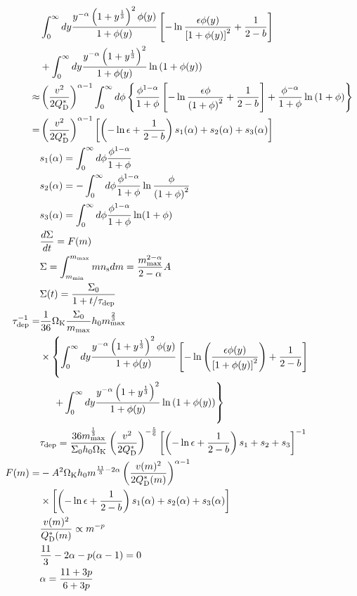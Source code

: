 \documentclass[11pt,a4paper,oneside,onecolumn]{jreport}
\begin{document}
\begin{align}
 &\int_0^{\infty} dy \frac{y^{- \alpha} \left( 1 + y^{\frac{1}{3}} \right)^2 \phi(y)}{1 + \phi(y)} \left[ - \ln \frac{\epsilon \phi(y)}{\left[ 1 + \phi(y) \right]^2} + \frac{1}{2 - b} \right]\\
 &+ \int_0^{\infty} dy \frac{y^{- \alpha} \left( 1 + y^{\frac{1}{3}} \right)^2}{1 + \phi(y)} \ln \left( 1 + \phi(y) \right)\\
 \approx& \left(\frac{v^2}{2Q_{\rm D}^{\ast}}\right)^{\alpha - 1} \int_0^{\infty} d \phi \left\{ \frac{\phi^{1 - \alpha}}{1 + \phi} \left[ - \ln \frac{\epsilon \phi}{\left(1 + \phi\right)^2} + \frac{1}{2 - b} \right] + \frac{\phi^{- \alpha}}{1 + \phi} \ln \left(1 + \phi \right) \right\}\\
 =& \left(\frac{v^2}{2Q_{\rm D}^{\ast}}\right)^{\alpha - 1} \left[ \left(- \ln \epsilon + \frac{1}{2 - b} \right) s_1(\alpha) + s_2(\alpha) + s_3(\alpha) \right]\\
 &s_1(\alpha) = \int_0^{\infty} d \phi \frac{\phi^{1 - \alpha}}{1 + \phi}\\
 &s_2(\alpha) = - \int_0^{\infty} d \phi \frac{\phi^{1 - \alpha}}{1 + \phi} \ln \frac{\phi}{\left(1 + \phi \right)^2}\\
 &s_3(\alpha) = \int_0^{\infty} d \phi \frac{\phi^{1 - \alpha}}{1 + \phi} \ln (1 + \phi)\\
 &\frac{d \Sigma}{d t} = F(m)\\
 &\Sigma = \int_{m_{\rm min}}^{m_{\rm max}} m n_{\rm s} dm = \frac{m_{\rm max}^{2 - \alpha}}{2 - \alpha} A\\ 
 &\Sigma(t) = \frac{\Sigma_0}{1 + t/\tau_{\rm dep}}\\
 \tau_{\rm dep}^{-1} =& \frac{1}{36}\Omega_{\rm K}\frac{\Sigma_0}{m_{\rm max}}h_0 m_{\rm max}^{\frac{2}{3}}\\
 &\times \left\{ \int_0^{\infty} dy \frac{y^{-\alpha}\left(1 + y^{\frac{1}{3}}\right)^2\phi(y)}{1 + \phi(y)} \left[ - \ln \left( \frac{\epsilon\phi(y)}{\left[1 + \phi(y)\right]^2} \right) + \frac{1}{2 - b} \right] \right.\\
 &\left. \ \ \ \ + \int_0^{\infty} dy \frac{y^{- 
\alpha}\left(1 + y^{\frac{1}{3}}\right)^2}{1 + \phi(y)} \ln \left( 1 + \phi(y) \right) \right\}\\
 &\tau_{\rm dep} = \frac{36 m_{\rm max}^{\frac{1}{3}}}{\Sigma_0h_0\Omega_{\rm K}} \left( \frac{v^2}{2Q_{\rm D}^{\ast}} \right)^{- \frac{5}{6}} \left[ \left(- \ln \epsilon + \frac{1}{2 - b} \right) s_1 + s_2 + s_3 \right]^{-1}\\
 F(m) =& - A^2 \Omega_{\rm K} h_0 m^{\frac{11}{3} - 2 \alpha} \left( \frac{v(m)^2}{2 Q_{\rm D}^{\ast}(m)} \right)^{\alpha - 1}\\
 &\times \left[ \left( - \ln \epsilon + \frac{1}{2 - b} \right) s_1(\alpha) + s_2(\alpha) + s_3(\alpha) \right]\\
 &\frac{v(m)^2}{Q_{\rm D}^{\ast}(m)} \propto m^{-p}\\ 
 &\frac{11}{3}-2\alpha-p(\alpha-1) = 0\\
 &\alpha = \frac{11+3p}{6+3p}
\end{align}
\end{document}
